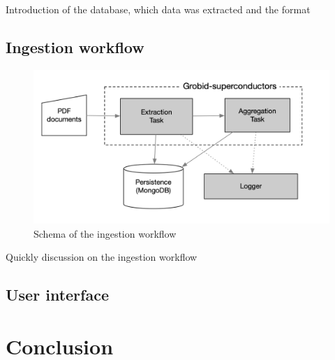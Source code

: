 \documentclass{article}
\begin{document}
Introduction of the database, which data was extracted and the format 

\subsection{Ingestion workflow}
\label{subsec:ingestion-workflow}

\begin{figure}[ht]
\includegraphics[width=\textwidth]{workflow-schema-1}
\caption{Schema of the ingestion workflow}
\end{figure}


Quickly discussion on the ingestion workflow 


\subsection{User interface}
\label{sucsec:supercon2-user-interface}


\section{Conclusion}
\label{sec:conclusion}



\end{document}
